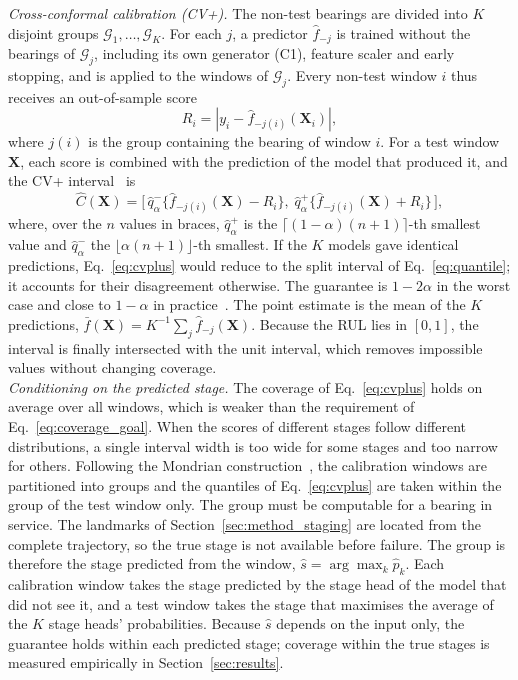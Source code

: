 \textit{Cross-conformal calibration (CV+).} The non-test bearings are
divided into $K$ disjoint groups $\mathcal{G}_1, \dots, \mathcal{G}_K$.
For each $j$, a predictor $\hat{f}_{-j}$ is trained without the
bearings of $\mathcal{G}_j$, including its own generator (C1), feature
scaler and early stopping, and is applied to the windows of
$\mathcal{G}_j$. Every non-test window $i$ thus receives an
out-of-sample score
\begin{equation}
  R_i = \left| y_i - \hat{f}_{-j(i)}(\mathbf{X}_i) \right|,
  \label{eq:oof_score}
\end{equation}
where $j(i)$ is the group containing the bearing of window $i$. For a
test window $\mathbf{X}$, each score is combined with the prediction of
the model that produced it, and the CV+
interval~\cite{barber2021jackknife} is
\begin{equation}
  \hat{C}(\mathbf{X}) = \Big[\,
  \hat{q}^{-}_{\alpha}\big\{ \hat{f}_{-j(i)}(\mathbf{X}) - R_i \big\},\;
  \hat{q}^{+}_{\alpha}\big\{ \hat{f}_{-j(i)}(\mathbf{X}) + R_i \big\}
  \,\Big],
  \label{eq:cvplus}
\end{equation}
where, over the $n$ values in braces, $\hat{q}^{+}_{\alpha}$ is the
$\lceil (1-\alpha)(n+1) \rceil$-th smallest value and
$\hat{q}^{-}_{\alpha}$ the $\lfloor \alpha (n+1) \rfloor$-th smallest.
If the $K$ models gave identical predictions, Eq.~\eqref{eq:cvplus}
would reduce to the split interval of Eq.~\eqref{eq:quantile}; it
accounts for their disagreement otherwise. The guarantee is
$1 - 2\alpha$ in the worst case and close to $1 - \alpha$ in
practice~\cite{barber2021jackknife}. The point estimate is the mean of
the $K$ predictions, $\bar{f}(\mathbf{X}) = K^{-1}\sum_j
\hat{f}_{-j}(\mathbf{X})$. Because the RUL lies in $[0,1]$, the
interval is finally intersected with the unit interval, which removes
impossible values without changing coverage.\\

\textit{Conditioning on the predicted stage.} The coverage of
Eq.~\eqref{eq:cvplus} holds on average over all windows, which is
weaker than the requirement of Eq.~\eqref{eq:coverage_goal}. When the
scores of different stages follow different distributions, a single
interval width is too wide for some stages and too narrow for others.
Following the Mondrian construction~\cite{vovk2005algorithmic}, the
calibration windows are partitioned into groups and the quantiles of
Eq.~\eqref{eq:cvplus} are taken within the group of the test window
only. The group must be computable for a bearing in service. The
landmarks of Section~\ref{sec:method_staging} are located from the
complete trajectory, so the true stage is not available before failure.
The group is therefore the stage predicted from the window,
$\hat{s} = \arg\max_k \hat{p}_k$. Each calibration window takes the
stage predicted by the stage head of the model that did not see it,
and a test window takes the stage that maximises the average of the
$K$ stage heads' probabilities. Because $\hat{s}$ depends on the input
only, the guarantee holds within each predicted stage; coverage within
the true stages is measured empirically in Section~\ref{sec:results}.\\

